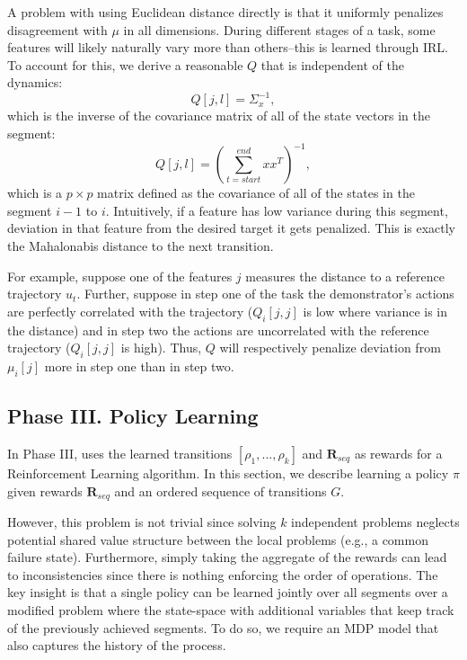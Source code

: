 A problem with using Euclidean distance directly is that it uniformly penalizes disagreement with $\mu$ in all dimensions.
During different stages of a task, some features will likely naturally vary more than others--this is learned through IRL.
To account for this, we derive a reasonable $Q$ that is independent of the dynamics:
\[
Q[j,l] = \Sigma^{-1}_x,
\]
which is the inverse of the covariance matrix of all of the state vectors in the segment:
\begin{equation}
Q[j,l] = (\sum_{t=start}^{end} x x^T)^{-1},
\label{localq}
\end{equation}
which is a $p \times p$ matrix defined as the covariance of all of the states in the segment $i-1$ to $i$.
Intuitively, if a feature has low variance during this segment, deviation in that feature from the desired target it gets penalized. 
This is exactly the Mahalonabis distance to the next transition. 

For example, suppose one of the features $j$ measures the distance to a reference trajectory $u_t$. 
Further, suppose in step one of the task the demonstrator's actions are perfectly correlated with the trajectory ($Q_{i}[j,j]$ is low where variance is in the distance) and in step two the actions are uncorrelated with the reference trajectory ($Q_{i}[j,j]$ is high).
Thus, $Q$ will respectively penalize deviation from $\mu_{i}[j]$ more in step one than in step two.


\subsection*{Phase III. Policy Learning}

In Phase III, \hirl uses the learned transitions $[\rho_1,...,\rho_k]$ and $\mathbf{R}_{seq}$ as rewards for a Reinforcement Learning algorithm.
In this section, we describe learning a policy $\pi$ given rewards $\mathbf{R}_{seq}$ and an ordered sequence of transitions $G$.

However, this problem is not trivial since solving $k$ independent problems neglects potential shared value structure between the local problems (e.g., a common failure state).
Furthermore, simply taking the aggregate of the rewards can lead to inconsistencies since there is nothing enforcing the order of operations.
The key insight is that a single policy can be learned jointly over all segments over a modified problem where the state-space with additional variables that keep track of the previously achieved segments.
To do so, we require an MDP model that also captures the history of the process.


